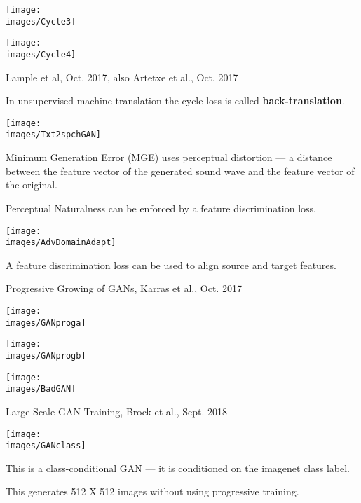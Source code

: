 {

\centerline{\texttt{[image: \\images/Cycle3]}}


\centerline{\texttt{[image: \\images/Cycle4]}}

         {Lample et al, Oct. 2017, also Artetxe et al., Oct. 2017}


In unsupervised machine translation the cycle loss is called {\bf back-translation}.


\centerline{\texttt{[image: \\images/Txt2spchGAN]}}

\vfill
Minimum Generation Error (MGE) uses {\color{red} perceptual distortion} ---
a distance between the feature vector of the generated sound wave and the
feature vector of the original.

\vfill
{\color{red}Perceptual Naturalness} can be enforced by a feature discrimination loss.


\centerline{\texttt{[image: \\images/AdvDomainAdapt]}}

A feature discrimination loss can be used to align source and target features.


\centerline{Progressive Growing of GANs, Karras et al., Oct. 2017}

\centerline{\texttt{[image: \\images/GANproga]}}


\centerline{\texttt{[image: \\images/GANprogb]}}


\centerline{\texttt{[image: \\images/BadGAN]}}

\centerline{Large Scale GAN Training, Brock et al., Sept. 2018}
\centerline{\texttt{[image: \\images/GANclass]}}

\vfill
This is a class-conditional GAN --- it is conditioned on the imagenet class label.

\vfill
This generates 512 X 512 images without using progressive training.

}
